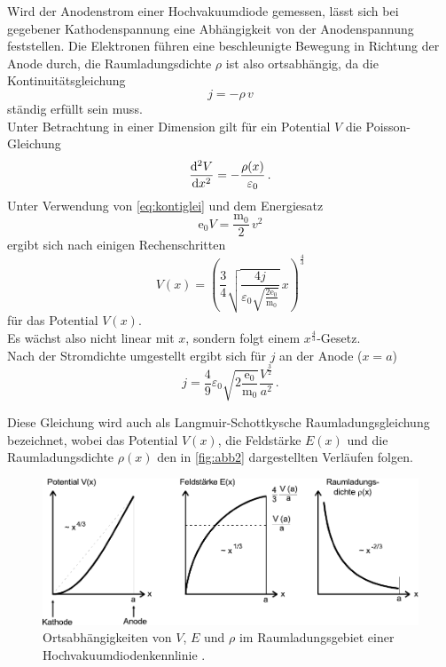 Wird der Anodenstrom einer Hochvakuumdiode gemessen, lässt sich 
bei gegebener Kathodenspannung eine Abhängigkeit von der Anodenspannung feststellen.
Die Elektronen führen eine beschleunigte Bewegung in Richtung der Anode durch,
die Raumladungsdichte $\rho$ ist also ortsabhängig, da die 
Kontinuitätsgleichung
\begin{equation}
    j = - \rho \, v
    \label{eq:kontiglei}
\end{equation}
ständig erfüllt sein muss. \\

Unter Betrachtung in einer Dimension gilt für ein Potential $V$ die Poisson-Gleichung
\begin{equation}
    \dfrac{\mathrm{d}^2 V}{\mathrm{d} x^2} = - \dfrac{\rho (x)}{\varepsilon_0} \,.
\end{equation}
Unter Verwendung von \eqref{eq:kontiglei} und dem Energiesatz
\begin{equation*}
    \text{e}_0 V = \dfrac{\text{m}_0}{2} \, v^2
\end{equation*}
ergibt sich nach einigen Rechenschritten
\begin{equation*}
    V(x) = \left(\dfrac{3}{4} \sqrt{\dfrac{4j}{\varepsilon_0 \sqrt{\frac{2\text{e}_0}{\text{m}_0}}}} \, x \right)^{\frac{4}{3}}
    \label{eq:potential}
\end{equation*}
für das Potential $V(x)$. \\

Es wächst also nicht linear mit $x$, sondern folgt einem $x^{\frac{4}{3}}$-Gesetz. \\

Nach der Stromdichte umgestellt ergibt sich für $j$ an der Anode ($x=a$)
\begin{equation}
    j = \dfrac{4}{9} \varepsilon_0 \sqrt{2\frac{\text{e}_0}{\text{m}_0}} \dfrac{V^{\frac{3}{2}}}{a^2} \,.
    \label{eq:anodestromdichte}
\end{equation}

Diese Gleichung wird auch als Langmuir-Schottkysche Raumladungsgleichung bezeichnet,
wobei das Potential $V(x)$, die Feldstärke $E(x)$ und die Raumladungsdichte $\rho(x)$
den in \autoref{fig:abb2} dargestellten Verläufen folgen.

\begin{figure}[H]
    \centering
    \includegraphics{figures/Abb4.pdf}
    \caption{Ortsabhängigkeiten von $V$, $E$ und $\rho$ im Raumladungsgebiet
             einer Hochvakuumdiodenkennlinie \cite{ap09}.}
    \label{fig:abb4}
\end{figure}


